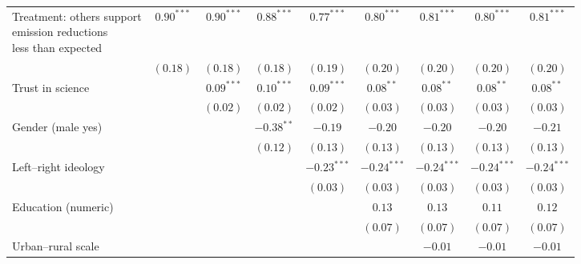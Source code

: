 \begin{table}[h]
\begin{center}
\begin{tabular}{l c c c c c c c c}
\shortstack{Treatment: others support\\emission reductions\\less than expected} & $0.90^{***}$ & $0.90^{***}$  & $0.88^{***}$  & $0.77^{***}$  & $0.80^{***}$  & $0.81^{***}$  & $0.80^{***}$  & $0.81^{***}$  \\
                                                                                & $(0.18)$     & $(0.18)$      & $(0.18)$      & $(0.19)$      & $(0.20)$      & $(0.20)$      & $(0.20)$      & $(0.20)$      \\
Trust in science                                                                &              & $0.09^{***}$  & $0.10^{***}$  & $0.09^{***}$  & $0.08^{**}$   & $0.08^{**}$   & $0.08^{**}$   & $0.08^{**}$   \\
                                                                                &              & $(0.02)$      & $(0.02)$      & $(0.02)$      & $(0.03)$      & $(0.03)$      & $(0.03)$      & $(0.03)$      \\
Gender (male yes)                                                               &              &               & $-0.38^{**}$  & $-0.19$       & $-0.20$       & $-0.20$       & $-0.20$       & $-0.21$       \\
                                                                                &              &               & $(0.12)$      & $(0.13)$      & $(0.13)$      & $(0.13)$      & $(0.13)$      & $(0.13)$      \\
Left–right ideology                                                             &              &               &               & $-0.23^{***}$ & $-0.24^{***}$ & $-0.24^{***}$ & $-0.24^{***}$ & $-0.24^{***}$ \\
                                                                                &              &               &               & $(0.03)$      & $(0.03)$      & $(0.03)$      & $(0.03)$      & $(0.03)$      \\
Education (numeric)                                                             &              &               &               &               & $0.13$        & $0.13$        & $0.11$        & $0.12$        \\
                                                                                &              &               &               &               & $(0.07)$      & $(0.07)$      & $(0.07)$      & $(0.07)$      \\
Urban–rural scale                                                               &              &               &               &               &               & $-0.01$       & $-0.01$       & $-0.01$       \\

\end{tabular}
\end{center}
\end{table}
